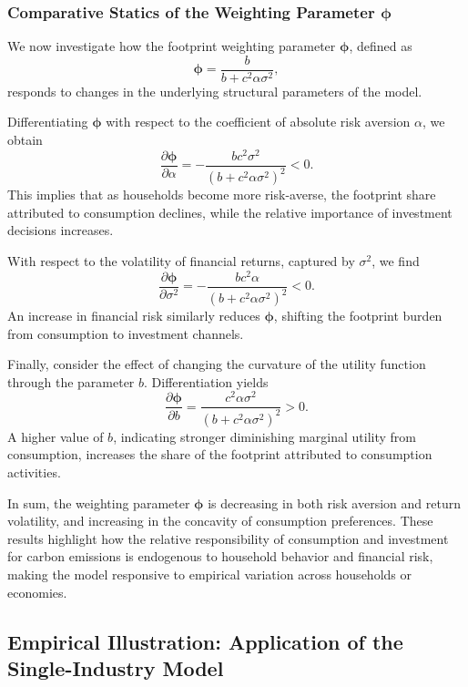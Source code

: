 \documentclass[12pt,a4paper]{article}%
\begin{document}
\subsubsection{Comparative Statics of the Weighting Parameter \( \boldsymbol{\phi} \)}

We now investigate how the footprint weighting parameter \( \boldsymbol{\phi} \), defined as
\[
\boldsymbol{\phi} = \frac{b}{b + c^2 \alpha \sigma^2},
\]
responds to changes in the underlying structural parameters of the model.

Differentiating \( \boldsymbol{\phi} \) with respect to the coefficient of absolute risk aversion \( \alpha \), we obtain
\[
\frac{\partial \boldsymbol{\phi}}{\partial \alpha} = -\frac{b c^2 \sigma^2}{{(b + c^2 \alpha \sigma^2)}^2} < 0.
\]
This implies that as households become more risk-averse, the footprint share attributed to consumption declines, while the relative importance of investment decisions increases.

With respect to the volatility of financial returns, captured by \( \sigma^2 \), we find
\[
\frac{\partial \boldsymbol{\phi}}{\partial \sigma^2} = -\frac{b c^2 \alpha}{{(b + c^2 \alpha \sigma^2)}^2} < 0.
\]
An increase in financial risk similarly reduces \( \boldsymbol{\phi} \), shifting the footprint burden from consumption to investment channels.

Finally, consider the effect of changing the curvature of the utility function through the parameter \( b \). Differentiation yields
\[
\frac{\partial \boldsymbol{\phi}}{\partial b} = \frac{c^2 \alpha \sigma^2}{{(b + c^2 \alpha \sigma^2)}^2} > 0.
\]
A higher value of \( b \), indicating stronger diminishing marginal utility from consumption, increases the share of the footprint attributed to consumption activities.

In sum, the weighting parameter \( \boldsymbol{\phi} \) is decreasing in both risk aversion and return volatility, and increasing in the concavity of consumption preferences. These results highlight how the relative responsibility of consumption and investment for carbon emissions is endogenous to household behavior and financial risk, making the model responsive to empirical variation across households or economies.

\subsection{Empirical Illustration: Application of the Single-Industry Model}
\end{document}
